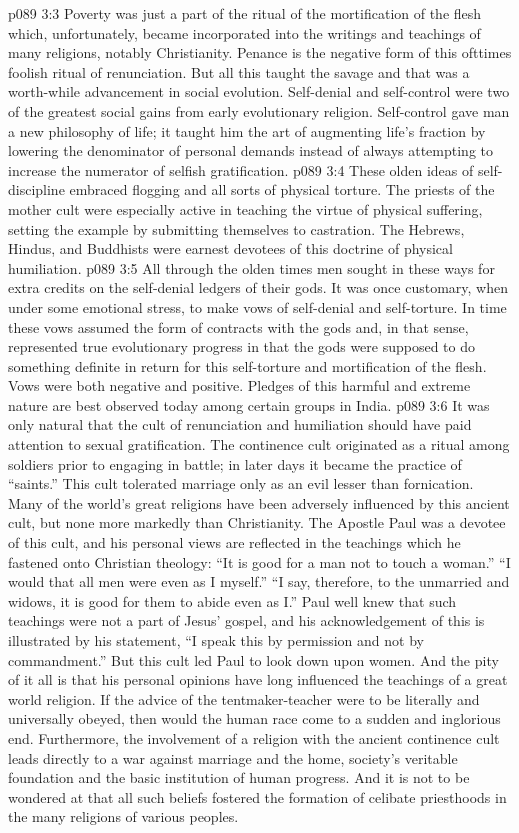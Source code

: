 \vs p089 3:3 Poverty was just a part of the ritual of the mortification of the flesh which, unfortunately, became incorporated into the writings and teachings of many religions, notably Christianity. Penance is the negative form of this ofttimes foolish ritual of renunciation. But all this taught the savage  and that was a worth\hyp{}while advancement in social evolution. Self\hyp{}denial and self\hyp{}control were two of the greatest social gains from early evolutionary religion. Self\hyp{}control gave man a new philosophy of life; it taught him the art of augmenting life’s fraction by lowering the denominator of personal demands instead of always attempting to increase the numerator of selfish gratification.
\vs p089 3:4 These olden ideas of self\hyp{}discipline embraced flogging and all sorts of physical torture. The priests of the mother cult were especially active in teaching the virtue of physical suffering, setting the example by submitting themselves to castration. The Hebrews, Hindus, and Buddhists were earnest devotees of this doctrine of physical humiliation.
\vs p089 3:5 All through the olden times men sought in these ways for extra credits on the self\hyp{}denial ledgers of their gods. It was once customary, when under some emotional stress, to make vows of self\hyp{}denial and self\hyp{}torture. In time these vows assumed the form of contracts with the gods and, in that sense, represented true evolutionary progress in that the gods were supposed to do something definite in return for this self\hyp{}torture and mortification of the flesh. Vows were both negative and positive. Pledges of this harmful and extreme nature are best observed today among certain groups in India.
\vs p089 3:6 \pc It was only natural that the cult of renunciation and humiliation should have paid attention to sexual gratification. The continence cult originated as a ritual among soldiers prior to engaging in battle; in later days it became the practice of “saints.” This cult tolerated marriage only as an evil lesser than fornication. Many of the world’s great religions have been adversely influenced by this ancient cult, but none more markedly than Christianity. The Apostle Paul was a devotee of this cult, and his personal views are reflected in the teachings which he fastened onto Christian theology: “It is good for a man not to touch a woman.” “I would that all men were even as I myself.” “I say, therefore, to the unmarried and widows, it is good for them to abide even as I.” Paul well knew that such teachings were not a part of Jesus’ gospel, and his acknowledgement of this is illustrated by his statement, “I speak this by permission and not by commandment.” But this cult led Paul to look down upon women. And the pity of it all is that his personal opinions have long influenced the teachings of a great world religion. If the advice of the tentmaker\hyp{}teacher were to be literally and universally obeyed, then would the human race come to a sudden and inglorious end. Furthermore, the involvement of a religion with the ancient continence cult leads directly to a war against marriage and the home, society’s veritable foundation and the basic institution of human progress. And it is not to be wondered at that all such beliefs fostered the formation of celibate priesthoods in the many religions of various peoples.
